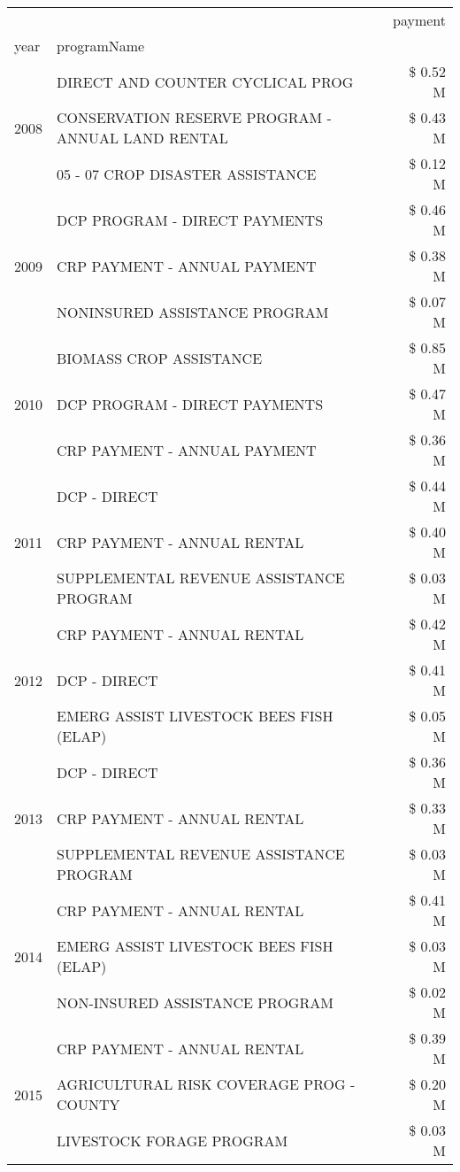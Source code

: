 \begin{tabular}{llr}
\toprule
 &  & payment \\
year & programName &  \\
\midrule
\multirow[t]{3}{*}{2008} & DIRECT AND COUNTER CYCLICAL PROG & \$ 0.52 M \\
 & CONSERVATION RESERVE PROGRAM - ANNUAL LAND RENTAL & \$ 0.43 M \\
 & 05 - 07 CROP DISASTER ASSISTANCE & \$ 0.12 M \\
\cline{1-3}
\multirow[t]{3}{*}{2009} & DCP PROGRAM - DIRECT PAYMENTS & \$ 0.46 M \\
 & CRP PAYMENT - ANNUAL PAYMENT & \$ 0.38 M \\
 & NONINSURED ASSISTANCE PROGRAM & \$ 0.07 M \\
\cline{1-3}
\multirow[t]{3}{*}{2010} & BIOMASS CROP ASSISTANCE & \$ 0.85 M \\
 & DCP PROGRAM - DIRECT PAYMENTS & \$ 0.47 M \\
 & CRP PAYMENT - ANNUAL PAYMENT & \$ 0.36 M \\
\cline{1-3}
\multirow[t]{3}{*}{2011} & DCP - DIRECT & \$ 0.44 M \\
 & CRP PAYMENT - ANNUAL RENTAL & \$ 0.40 M \\
 & SUPPLEMENTAL REVENUE ASSISTANCE PROGRAM & \$ 0.03 M \\
\cline{1-3}
\multirow[t]{3}{*}{2012} & CRP PAYMENT - ANNUAL RENTAL & \$ 0.42 M \\
 & DCP - DIRECT & \$ 0.41 M \\
 & EMERG ASSIST LIVESTOCK BEES FISH (ELAP) & \$ 0.05 M \\
\cline{1-3}
\multirow[t]{3}{*}{2013} & DCP - DIRECT & \$ 0.36 M \\
 & CRP PAYMENT - ANNUAL RENTAL & \$ 0.33 M \\
 & SUPPLEMENTAL REVENUE ASSISTANCE PROGRAM & \$ 0.03 M \\
\cline{1-3}
\multirow[t]{3}{*}{2014} & CRP PAYMENT - ANNUAL RENTAL & \$ 0.41 M \\
 & EMERG ASSIST LIVESTOCK BEES FISH (ELAP) & \$ 0.03 M \\
 & NON-INSURED ASSISTANCE PROGRAM & \$ 0.02 M \\
\cline{1-3}
\multirow[t]{3}{*}{2015} & CRP PAYMENT - ANNUAL RENTAL & \$ 0.39 M \\
 & AGRICULTURAL RISK COVERAGE PROG - COUNTY & \$ 0.20 M \\
 & LIVESTOCK FORAGE PROGRAM & \$ 0.03 M \\
\cline{1-3}

\end{tabular}
